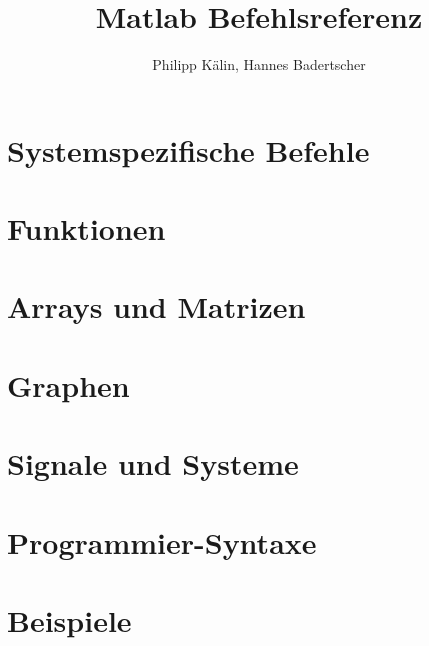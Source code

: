 \documentclass{article}
\title{Matlab Befehlsreferenz}
\author{Philipp Kälin, Hannes Badertscher}
\begin{document}
  

\section{Systemspezifische Befehle}
	

\section{Funktionen}
  
  

\section{Arrays und Matrizen}
  
  
\section{Graphen}
  
    
\section{Signale und Systeme}
  
  
\section{Programmier-Syntaxe}
  

\section{Beispiele}
  
\end{document}
